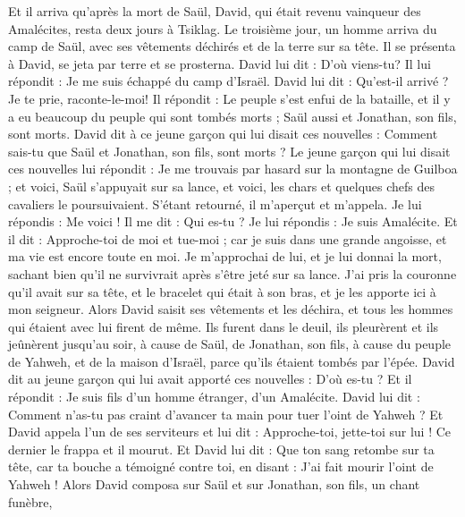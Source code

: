 \begin{multicols}{2}
\VerseOne{}Et il arriva qu’après la mort de Saül, David, qui était revenu vainqueur des Amalécites, resta deux jours à Tsiklag.
Le troisième jour, un homme arriva du camp de Saül, avec ses vêtements déchirés et de la terre sur sa tête. Il se présenta à David, se jeta par terre et se prosterna.
David lui dit : D'où viens-tu? Il lui répondit : Je me suis échappé du camp d'Israël.
David lui dit : Qu'est-il arrivé ? Je te prie, raconte-le-moi! Il répondit : Le peuple s'est enfui de la bataille, et il y a eu beaucoup du peuple qui sont tombés morts ; Saül aussi et Jonathan, son fils, sont morts.
David dit à ce jeune garçon qui lui disait ces nouvelles : Comment sais-tu que Saül et Jonathan, son fils, sont morts ?
Le jeune garçon qui lui disait ces nouvelles lui répondit : Je me trouvais par hasard sur la montagne de Guilboa ; et voici, Saül s’appuyait sur sa lance, et voici, les chars et quelques chefs des cavaliers le poursuivaient.
S’étant retourné, il m’aperçut et m'appela. Je lui répondis : Me voici !
Il me dit : Qui es-tu ? Je lui répondis : Je suis Amalécite.
Et il dit : Approche-toi de moi et tue-moi ; car je suis dans une grande angoisse, et ma vie est encore toute en moi.
Je m’approchai de lui, et je lui donnai la mort, sachant bien qu'il ne survivrait après s’être jeté sur sa lance. J'ai pris la couronne qu'il avait sur sa tête, et le bracelet qui était à son bras, et je les apporte ici à mon seigneur.
Alors David saisit ses vêtements et les déchira, et tous les hommes qui étaient avec lui firent de même.
Ils furent dans le deuil, ils pleurèrent et ils jeûnèrent jusqu'au soir, à cause de Saül, de Jonathan, son fils, à cause du peuple de Yahweh, et de la maison d'Israël, parce qu'ils étaient tombés par l'épée.
David dit au jeune garçon qui lui avait apporté ces nouvelles : D'où es-tu ? Et il répondit : Je suis fils d'un homme étranger, d’un Amalécite.
David lui dit : Comment n'as-tu pas craint d'avancer ta main pour tuer l’oint de Yahweh ?
Et David appela l'un de ses serviteurs et lui dit : Approche-toi, jette-toi sur lui ! Ce dernier le frappa et il mourut.
Et David lui dit : Que ton sang retombe sur ta tête, car ta bouche a témoigné contre toi, en disant : J'ai fait mourir l’oint de Yahweh !
Alors David composa sur Saül et sur Jonathan, son fils, un chant funèbre,

\end{multicols}
